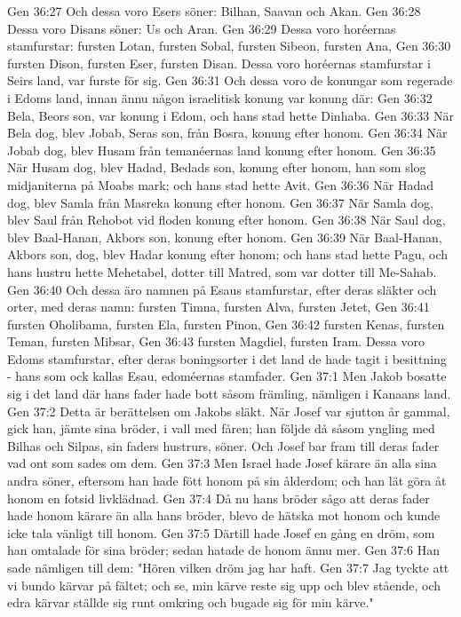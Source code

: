 Gen 36:27  Och dessa voro Esers söner: Bilhan, Saavan och Akan.
Gen 36:28  Dessa voro Disans söner: Us och Aran.
Gen 36:29  Dessa voro horéernas stamfurstar: fursten Lotan, fursten Sobal, fursten Sibeon, fursten Ana,
Gen 36:30  fursten Dison, fursten Eser, fursten Disan. Dessa voro horéernas stamfurstar i Seirs land, var furste för sig.
Gen 36:31  Och dessa voro de konungar som regerade i Edoms land, innan ännu någon israelitisk konung var konung där:
Gen 36:32  Bela, Beors son, var konung i Edom, och hans stad hette Dinhaba.
Gen 36:33  När Bela dog, blev Jobab, Seras son, från Bosra, konung efter honom.
Gen 36:34  När Jobab dog, blev Husam från temanéernas land konung efter honom.
Gen 36:35  När Husam dog, blev Hadad, Bedads son, konung efter honom, han som slog midjaniterna på Moabs mark; och hans stad hette Avit.
Gen 36:36  När Hadad dog, blev Samla från Masreka konung efter honom.
Gen 36:37  När Samla dog, blev Saul från Rehobot vid floden konung efter honom.
Gen 36:38  När Saul dog, blev Baal-Hanan, Akbors son, konung efter honom.
Gen 36:39  När Baal-Hanan, Akbors son, dog, blev Hadar konung efter honom; och hans stad hette Pagu, och hans hustru hette Mehetabel, dotter till Matred, som var dotter till Me-Sahab.
Gen 36:40  Och dessa äro namnen på Esaus stamfurstar, efter deras släkter och orter, med deras namn: fursten Timna, fursten Alva, fursten Jetet,
Gen 36:41  fursten Oholibama, fursten Ela, fursten Pinon,
Gen 36:42  fursten Kenas, fursten Teman, fursten Mibsar,
Gen 36:43  fursten Magdiel, fursten Iram. Dessa voro Edoms stamfurstar, efter deras boningsorter i det land de hade tagit i besittning - hans som ock kallas Esau, edoméernas stamfader.
Gen 37:1  Men Jakob bosatte sig i det land där hans fader hade bott såsom främling, nämligen i Kanaans land.
Gen 37:2  Detta är berättelsen om Jakobs släkt. När Josef var sjutton år gammal, gick han, jämte sina bröder, i vall med fåren; han följde då såsom yngling med Bilhas och Silpas, sin faders hustrurs, söner. Och Josef bar fram till deras fader vad ont som sades om dem.
Gen 37:3  Men Israel hade Josef kärare än alla sina andra söner, eftersom han hade fött honom på sin ålderdom; och han lät göra åt honom en fotsid livklädnad.
Gen 37:4  Då nu hans bröder sågo att deras fader hade honom kärare än alla hans bröder, blevo de hätska mot honom och kunde icke tala vänligt till honom.
Gen 37:5  Därtill hade Josef en gång en dröm, som han omtalade för sina bröder; sedan hatade de honom ännu mer.
Gen 37:6  Han sade nämligen till dem: "Hören vilken dröm jag har haft.
Gen 37:7  Jag tyckte att vi bundo kärvar på fältet; och se, min kärve reste sig upp och blev stående, och edra kärvar ställde sig runt omkring och bugade sig för min kärve."
